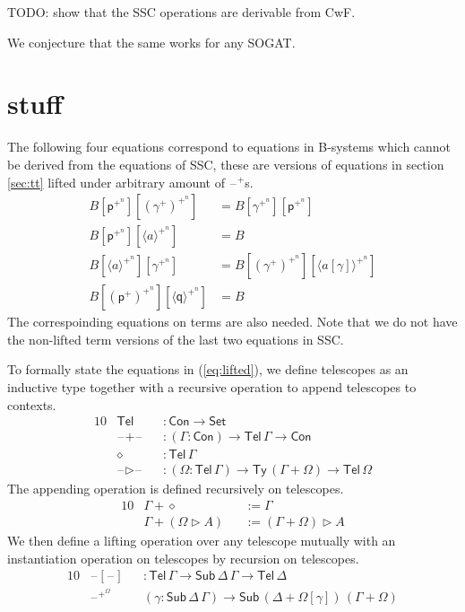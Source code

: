 \documentclass[sigplan,10pt,anonymous,review]{acmart}\settopmatter{printfolios=true,printccs=false,printacmref=false}
\newcommand{\ra}{\rightarrow}
\newcommand{\Set}{\mathsf{Set}}
\newcommand{\Ty}{\mathsf{Ty}}
\newcommand{\Con}{\mathsf{Con}}
\newcommand{\Sub}{\mathsf{Sub}}
\newcommand{\Tel}{\mathsf{Tel}}
\newcommand{\p}{\mathsf{p}}
\newcommand{\q}{\mathsf{q}}
\newcommand{\ext}{\mathop{\triangleright}}
\newcommand{\blank}{\mathord{\hspace{1pt}\text{--}\hspace{1pt}}} %
\begin{document}
TODO: show that the SSC operations are derivable from CwF.

We conjecture that the same works for any SOGAT.

\section{stuff}

The following four equations correspond to equations in B-systems which cannot
be derived from the equations of SSC, these are versions of equations in section
\ref{sec:tt} lifted under arbitrary amount of $\blank^+$s.
\begin{equation}\label{eq:lifted}
\begin{aligned}
  B[\p^{+^n}][(\gamma^+)^{+^n}] & = B[\gamma^{+^n}][\p^{+^n}] \\
  B[\p^{+^n}][\langle a \rangle^{+^n}] & = B \\
  B[\langle a \rangle^{+^n}][\gamma^{+^n}] & = B[(\gamma^+)^{+^n}][\langle a[\gamma] \rangle^{+^n}] \\
  B[(\p^+)^{+^n}][\langle\q\rangle^{+^n}] & = B
\end{aligned}
\end{equation}
The correspoinding equations on terms are also needed. Note that we do not have
the non-lifted term versions of the last two equations in SSC.

To formally state the equations in (\ref{eq:lifted}), we define telescopes as an
inductive type together with a recursive operation to append telescopes to
contexts.
\begin{alignat*}{10}
  & \Tel && : \Con\ra\Set \\
  & \blank+\blank && : (\Gamma:\Con)\ra\Tel\,\Gamma\ra\Con \\
  & \diamond && : \Tel\,\Gamma \\
  & \blank\ext\blank && : (\Omega:\Tel\,\Gamma)\ra\Ty\,(\Gamma+\Omega)\ra\Tel\,\Omega
\end{alignat*}
The appending operation is defined recursively on telescopes.
\begin{alignat*}{10}
  & \Gamma+\diamond && := \Gamma \\
  & \Gamma+(\Omega\ext A) && := (\Gamma+\Omega)\ext A
\end{alignat*}
We then define a lifting operation over any telescope mutually with an
instantiation operation on telescopes by recursion on telescopes.
\begin{alignat*}{10}
  & \blank[\blank] && : \Tel\,\Gamma\ra\Sub\,\Delta\,\Gamma\ra\Tel\,\Delta \\
  & \blank^{+^\Omega} && (\gamma:\Sub\,\Delta\,\Gamma)\ra\Sub\,(\Delta+\Omega[\gamma])\,(\Gamma+\Omega)
\end{alignat*}
\end{document}
